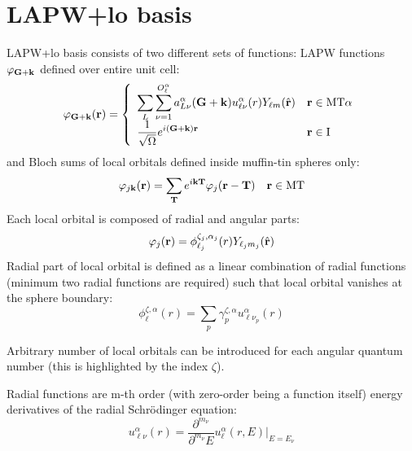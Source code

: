 \hypertarget{basis_basis1}{}\section{L\+A\+P\+W+lo basis}\label{basis_basis1}
L\+A\+P\+W+lo basis consists of two different sets of functions\+: L\+A\+P\+W functions $ \varphi_{{\bf G+k}} $ defined over entire unit cell\+: \[ \varphi_{{\bf G+k}}({\bf r}) = \left\{ \begin{array}{ll} \displaystyle \sum_{L} \sum_{\nu=1}^{O_{\ell}^{\alpha}} a_{L\nu}^{\alpha}({\bf G+k})u_{\ell \nu}^{\alpha}(r) Y_{\ell m}(\hat {\bf r}) & {\bf r} \in {\rm MT} \alpha \\ \displaystyle \frac{1}{\sqrt \Omega} e^{i({\bf G+k}){\bf r}} & {\bf r} \in {\rm I} \end{array} \right. \] and Bloch sums of local orbitals defined inside muffin-\/tin spheres only\+: \[ \begin{array}{ll} \displaystyle \varphi_{j{\bf k}}({\bf r})=\sum_{{\bf T}} e^{i{\bf kT}} \varphi_{j}({\bf r - T}) & {\rm {\bf r} \in MT} \end{array} \] Each local orbital is composed of radial and angular parts\+: \[ \varphi_{j}({\bf r}) = \phi_{\ell_j}^{\zeta_j,\alpha_j}(r) Y_{\ell_j m_j}(\hat {\bf r}) \] Radial part of local orbital is defined as a linear combination of radial functions (minimum two radial functions are required) such that local orbital vanishes at the sphere boundary\+: \[ \phi_{\ell}^{\zeta, \alpha}(r) = \sum_{p}\gamma_{p}^{\zeta,\alpha} u_{\ell \nu_p}^{\alpha}(r) \]

Arbitrary number of local orbitals can be introduced for each angular quantum number (this is highlighted by the index $ \zeta $).

Radial functions are m-\/th order (with zero-\/order being a function itself) energy derivatives of the radial Schrödinger equation\+: \[ u_{\ell \nu}^{\alpha}(r) = \frac{\partial^{m_{\nu}}}{\partial^{m_{\nu}}E}u_{\ell}^{\alpha}(r,E)\Big|_{E=E_{\nu}} \] 